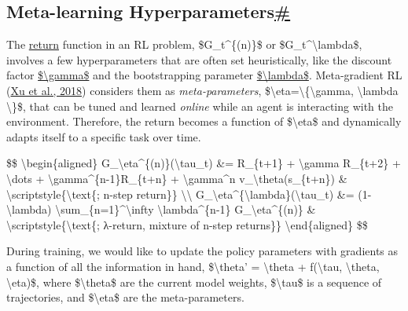 \subsection{\texorpdfstring{Meta-learning Hyperparameters\hyperref[meta-learning-hyperparameters]{\#}}{Meta-learning Hyperparameters\#}}\label{meta-learning-hyperparameters}

The \href{https://lilianweng.github.io/posts/2018-02-19-rl-overview/\#value-function}{return} function in an RL problem, \$G\_t\^{}\{(n)\}\$ or \$G\_t\^{}\textbackslash lambda\$, involves a few hyperparameters that are often set heuristically, like the discount factor \href{https://lilianweng.github.io/posts/2018-02-19-rl-overview/\#value-function}{\$\textbackslash gamma\$} and the bootstrapping parameter \href{https://lilianweng.github.io/posts/2018-02-19-rl-overview/\#combining-td-and-mc-learning}{\$\textbackslash lambda\$}. Meta-gradient RL (\href{http://papers.nips.cc/paper/7507-meta-gradient-reinforcement-learning.pdf}{Xu et al., 2018}) considers them as \emph{meta-parameters}, \$\textbackslash eta=\textbackslash\{\textbackslash gamma, \textbackslash lambda \textbackslash\}\$, that can be tuned and learned \emph{online} while an agent is interacting with the environment. Therefore, the return becomes a function of \$\textbackslash eta\$ and dynamically adapts itself to a specific task over time.

\$\$ \textbackslash begin\{aligned\} G\_\textbackslash eta\^{}\{(n)\}(\textbackslash tau\_t) \&= R\_\{t+1\} + \textbackslash gamma R\_\{t+2\} + \textbackslash dots + \textbackslash gamma\^{}\{n-1\}R\_\{t+n\} + \textbackslash gamma\^{}n v\_\textbackslash theta(s\_\{t+n\}) \& \textbackslash scriptstyle\{\textbackslash text\{; n-step return\}\} \textbackslash\textbackslash{} G\_\textbackslash eta\^{}\{\textbackslash lambda\}(\textbackslash tau\_t) \&= (1-\textbackslash lambda) \textbackslash sum\_\{n=1\}\^{}\textbackslash infty \textbackslash lambda\^{}\{n-1\} G\_\textbackslash eta\^{}\{(n)\} \& \textbackslash scriptstyle\{\textbackslash text\{; λ-return, mixture of n-step returns\}\} \textbackslash end\{aligned\} \$\$

During training, we would like to update the policy parameters with gradients as a function of all the information in hand, \$\textbackslash theta' = \textbackslash theta + f(\textbackslash tau, \textbackslash theta, \textbackslash eta)\$, where \$\textbackslash theta\$ are the current model weights, \$\textbackslash tau\$ is a sequence of trajectories, and \$\textbackslash eta\$ are the meta-parameters.

